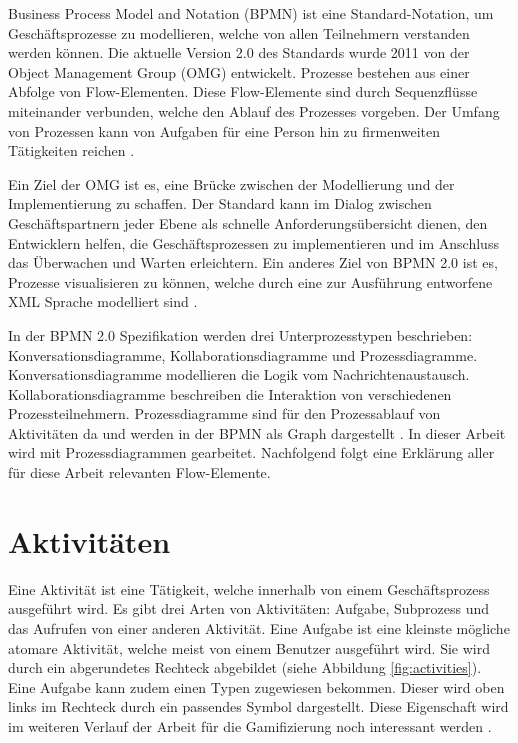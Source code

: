 Business Process Model and Notation (BPMN) ist eine Standard-Notation, um Geschäftsprozesse zu modellieren, welche von allen Teilnehmern verstanden werden können. Die aktuelle Version 2.0 des Standards wurde 2011 von der Object Management Group (OMG) entwickelt. Prozesse bestehen aus einer Abfolge von Flow-Elementen. Diese Flow-Elemente sind durch Sequenzflüsse miteinander verbunden, welche den Ablauf des Prozesses vorgeben. Der Umfang von Prozessen kann von Aufgaben für eine Person hin zu firmenweiten Tätigkeiten reichen \cite{omgbpmn}.

Ein Ziel der OMG ist es, eine Brücke zwischen der Modellierung und der Implementierung zu schaffen. Der Standard kann im Dialog zwischen Geschäftspartnern jeder Ebene als schnelle Anforderungsübersicht dienen, den Entwicklern helfen, die Geschäftsprozessen zu implementieren und im Anschluss das Überwachen und Warten erleichtern. Ein anderes Ziel von BPMN 2.0 ist es, Prozesse visualisieren zu können, welche durch eine zur Ausführung entworfene XML Sprache modelliert sind \cite{omgbpmn}.

In der BPMN 2.0 Spezifikation werden drei Unterprozesstypen beschrieben: Konversationsdiagramme, Kollaborationsdiagramme und Prozessdiagramme.
Konversationsdiagramme modellieren die Logik vom Nachrichtenaustausch. Kollaborationsdiagramme beschreiben die Interaktion von verschiedenen Prozessteilnehmern. Prozessdiagramme sind für den Prozessablauf von Aktivitäten da und werden in der BPMN als Graph dargestellt \cite{omgbpmn}. In dieser Arbeit wird mit Prozessdiagrammen gearbeitet. Nachfolgend folgt eine Erklärung aller für diese Arbeit relevanten Flow-Elemente.

\section{Aktivitäten}

Eine Aktivität ist eine Tätigkeit, welche innerhalb von einem Geschäftsprozess ausgeführt wird. Es gibt drei Arten von Aktivitäten: Aufgabe, Subprozess und das Aufrufen von einer anderen Aktivität. Eine Aufgabe ist eine kleinste mögliche atomare Aktivität, welche meist von einem Benutzer ausgeführt wird. Sie wird durch ein abgerundetes Rechteck abgebildet (siehe Abbildung \ref{fig:activities}).
Eine Aufgabe kann zudem einen Typen zugewiesen bekommen. Dieser wird oben links im Rechteck durch ein passendes Symbol dargestellt. Diese Eigenschaft wird im weiteren Verlauf der Arbeit für die Gamifizierung noch interessant werden \cite{omgbpmn}.

